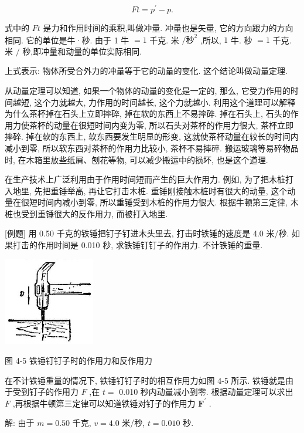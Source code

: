 \documentclass[10pt]{article}
\begin{document}
\[
{Ft} = {p}^{\prime } - p.
\]

式中的 \({Ft}\) 是力和作用时间的乘积,叫做冲量. 冲量也是矢量, 它的方向跟力的方向相同. 它的单位是牛·秒. 由于 1 牛 \(= 1\) 千克. 米 \(/{\text{秒}}^{2}\) ,所以, \(1\) 牛. 秒 \(= 1\) 千克. 米 \(/\) 秒,即冲量和动量的单位实际相同.

上式表示: 物体所受合外力的冲量等于它的动量的变化. 这个结论叫做动量定理.

从动量定理可以知道, 如果一个物体的动量的变化是一定的, 那么, 它受力作用的时间越短, 这个力就越大, 力作用的时间越长, 这个力就越小. 利用这个道理可以解释为什么茶杯掉在石头上立即摔碎, 掉在软的东西上不易摔碎. 掉在石头上, 石头的作用力使茶杯的动量在很短时间内变为零, 所以石头对茶杯的作用力很大, 茶杯立即摔碎. 掉在软的东西上, 软东西要发生明显的形变, 这就使茶杯动量在较长的时间内减小到零, 所以软东西对茶杯的作用力比较小, 茶杯不易摔碎. 搬运玻璃等易碎物品时, 在木箱里放些纸屑、刨花等物, 可以减少搬运中的损坏, 也是这个道理.

在生产技术上广泛利用由于作用时间短而产生的巨大作用力. 例如, 为了把木桩打入地里, 先把重锤举高, 再让它打击木桩. 重锤刚接触木桩时有很大的动量, 这个动量在很短时间内减小到零, 所以重锤受到木桩的作用力很大. 根据牛顿第三定律, 木桩也受到重锤很大的反作用力, 而被打入地里.

[例题] 用 0.50 千克的铁锤把钉子钉进木头里去, 打击时铁锤的速度是 4.0 米/秒. 如果打击的作用时间是 0.010 秒, 求铁锤钉钉子的作用力. 不计铁锤的重量.

\begin{center}
\includegraphics[max width=0.3\textwidth]{images/01912d55-147c-70aa-b0e0-1782a122f948_117_857864.jpg}
\end{center}

图 4-5 铁锤钉钉子时的作用力和反作用力

在不计铁锤重量的情况下, 铁锤钉钉子时的相互作用力如图 4-5 所示. 铁锤就是由于受到钉子的作用力 \(F\) ,在 \(t =\) 0.010 秒内动量减小到零. 根据动量定理可以求出 \(F\) ,再根据牛顿第三定律可以知道铁锤对钉子的作用力 \({\mathbf{F}}^{\prime }\) .

解: 由于 \(m = {0.50}\) 千克, \(v = {4.0}\) 米/秒, \(t = {0.010}\) 秒.
\end{document}
